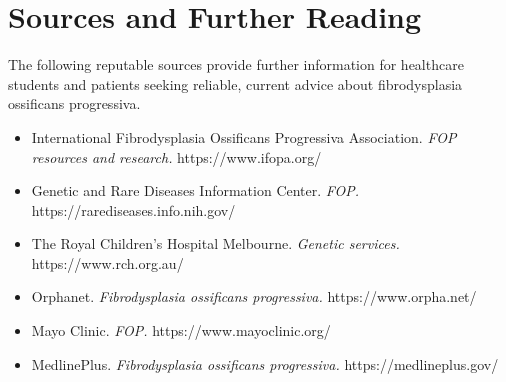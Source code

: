 \section*{Sources and Further Reading}
The following reputable sources provide further information for healthcare students and patients seeking reliable, current advice about fibrodysplasia ossificans progressiva.
\begin{itemize}
    \item International Fibrodysplasia Ossificans Progressiva Association. \textit{FOP resources and research.} https://www.ifopa.org/
    \item Genetic and Rare Diseases Information Center. \textit{FOP.} https://rarediseases.info.nih.gov/
    \item The Royal Children's Hospital Melbourne. \textit{Genetic services.} https://www.rch.org.au/
    \item Orphanet. \textit{Fibrodysplasia ossificans progressiva.} https://www.orpha.net/
    \item Mayo Clinic. \textit{FOP.} https://www.mayoclinic.org/
    \item MedlinePlus. \textit{Fibrodysplasia ossificans progressiva.} https://medlineplus.gov/
\end{itemize}
